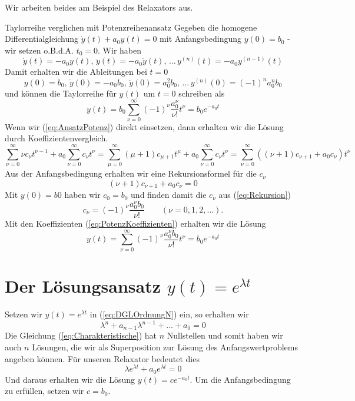 Wir arbeiten beides am Beispiel des Relaxators aus.
\begin{example}{Taylorreihe verglichen mit Potenzreihenansatz}
  Gegeben die homogene Differentialgleichung $\dot{y}(t)+a_0y(t)=0$ mit
  Anfangsbedingung $y(0)=b_0$ - wir setzen o.B.d.A. $t_0=0$. Wir haben
  \[ \dot{y}(t)=-a_0y(t),\, \ddot{y}(t)=-a_0\dot{y}(t),\,\dots\, 
      y^{(n)}(t)=-a_0y^{(n-1)}(t)\]
  Damit erhalten wir die Ableitungen bei $t=0$
  \[ y(0)=b_0,\, \dot{y}(0)=-a_0b_0,\, \ddot{y}(0)=a_0^2b_0,\,\dots\, 
     y^{(n)}(0)=(-1)^na_0^nb_0\]
  und können die Taylorreihe für $y(t)$ um $t=0$ schreiben als
  \begin{equation}
    y(t)=b_0\sum\limits_{\nu=0}^{\infty}(-1)^\nu\frac{a_0^\nu}{\nu!}t^\nu=b_0e^{-a_0t}
    \label{eq:SoluTaylor}
  \end{equation}
Wenn wir (\ref{eq:AnsatzPotenz}) direkt einsetzen, dann erhalten wir die Lösung
durch Koeffizientenvergleich.
  \[ \sum\limits_{\nu=0}^{\infty}\nu c_\nu t^{\nu-1}+ 
      a_0\sum\limits_{\nu=0}^{\infty}c_\nu t^\nu=
      \sum\limits_{\mu=0}^{\infty}(\mu+1)c_{\mu+1}t^\mu+ 
      a_0\sum\limits_{\nu=0}^{\infty}c_\nu t^\nu=
      \sum\limits_{\nu=0}^{\infty} \left((\nu+1)c_{\nu+1}+a_0c_\nu\right) t^\nu
  \]
  Aus der Anfangsbedingung erhalten wir eine Rekursionsformel für die $c_\nu$
  \begin{equation}
    (\nu+1)c_{\nu+1}+a_0c_\nu=0
    \label{eq:Rekursion}
  \end{equation}
  Mit $y(0)=b0$ haben wir $c_0=b_0$ und finden damit die $c_\nu$ aus
  (\ref{eq:Rekursion}) 
    \begin{equation}
      c_{\nu}=(-1)^\nu\frac{a_0^\nu b_0}{\nu!}\qquad (\nu=0,1,2,\dots).
    \label{eq:PotenzKoeffizienten}
  \end{equation}
  Mit den Koeffizienten (\ref{eq:PotenzKoeffizienten}) erhalten wir die Lösung
  \begin{equation}
    y(t)=\sum\limits_{\nu=0}^{\infty}(-1)^\nu\frac{a_0^\nu b_0}{\nu!}t^\nu=b_0e^{-a_0t}
    \label{eq:SoluPotenz}
  \end{equation}
\end{example}
%
\section{Der Lösungsansatz $y(t)=e^{\lambda t}$}
Setzen wir $y(t)=e^{\lambda t}$ in (\ref{eq:DGLOrdnungN}) ein, so erhalten wir
\begin{equation}
  \lambda^n+a_{n-1}\lambda^{n-1}+\dots +a_0=0
  \label{eq:Charakteristische}
\end{equation}
Die Gleichung (\ref{eq:Charakteristische}) hat $n$ Nullstellen und somit haben
wir auch $n$ Lösungen, die wir als Superposition zur Lösung des
Anfangswertproblems angeben können. Für unseren Relaxator bedeutet dies
\[ \lambda e^{\lambda t}+a_0e^{\lambda t}=0\]
Und daraus erhalten wir die Lösung $y(t)=ce^{-a_0 t}$. Um die Anfangsbedingung
zu erfüllen, setzen wir $c=b_0$.

